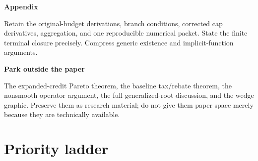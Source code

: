 \documentclass[11pt,letterpaper]{article}
\begin{document}
\textbf{Appendix}

Retain the original-budget derivations, branch conditions, corrected cap derivatives,
aggregation, and one reproducible numerical packet. State the finite terminal closure
precisely. Compress generic existence and implicit-function arguments.

\textbf{Park outside the paper}

The expanded-credit Pareto theorem, the baseline tax/rebate theorem, the nonsmooth
operator argument, the full generalized-root discussion, and the wedge graphic. Preserve
them as research material; do not give them paper space merely because they are
technically available.

\section{Priority ladder}\label{priority-ladder}

\begingroup\small\setlength{\tabcolsep}{5pt}\renewcommand{\arraystretch}{1.17}
\end{document}
